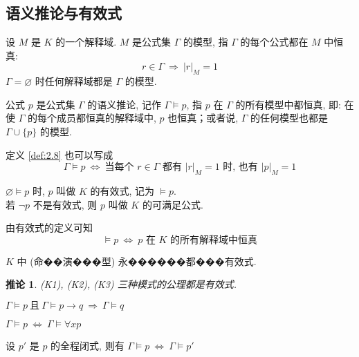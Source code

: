 \documentclass[
    color=black,
    device=normal,
    lang=cn
]{elegantnote}
\newtheorem{deduction}{推论}[section]
\begin{document}
\subsection{语义推论与有效式}
\begin{definition}[模型]
    设 $M$ 是 $K$ 的一个解释域.  $M$ 是公式集 $\Gamma$ 的模型, 指 $\Gamma$ 的每个公式都在 $M$ 中恒真:
    $$
        r\in \Gamma\ \Rightarrow\  \lvert r\rvert_M=1
    $$
    $\Gamma=\varnothing$ 时任何解释域都是 $\Gamma$ 的模型.
\end{definition}
\begin{definition}[语义推论]\label{def:2.8}
    公式 $p$ 是公式集 $\Gamma$ 的语义推论, 记作 $\Gamma\vDash p$, 指 $p$ 在 $\Gamma$ 的所有模型中都恒真, 即: 在使 $\Gamma$ 的每个成员都恒真的解释域中, $p$ 也恒真；或者说, $\Gamma$ 的任何模型也都是 $\Gamma\cup \{p\}$ 的模型.
\end{definition}
定义 \ref{def:2.8} 也可以写成
$$
    \Gamma\vDash p\ \Leftrightarrow\ \text{当每个 $r\in\Gamma$ 都有 $\lvert r\rvert_M=1$ 时, 也有 $\lvert p\rvert_M = 1$}
$$
\begin{definition}[有效式与满足公式]
    $\varnothing\vDash p$ 时, $p$ 叫做 $K$ 的有效式, 记为 $\vDash p$.\\
    若 $\lnot p$ 不是有效式, 则 $p$ 叫做 $K$ 的可满足公式.
\end{definition}
由有效式的定义可知
$$
    \vDash p \ \Leftrightarrow\ \text{$p$ 在 $K$ 的所有解释域中恒真}
$$
\begin{proposition}
    $K$ 中 (命��演���型) 永������都���有效式.
\end{proposition}
\begin{deduction}
    (K1), (K2), (K3) 三种模式的公理都是有效式.
\end{deduction}
\begin{proposition}
    $\Gamma\vDash p\ \text{且}\ \Gamma\vDash p\to q\ \Rightarrow\  \Gamma\vDash q$
\end{proposition}
\begin{proposition}
    $\Gamma\vDash p\ \Leftrightarrow\ \Gamma\vDash\forall xp$
\end{proposition}
\begin{proposition}
    设 $p'$ 是 $p$ 的全程闭式, 则有 $\Gamma\vDash p\ \Leftrightarrow\  \Gamma\vDash p'$
\end{proposition}
\end{document}
